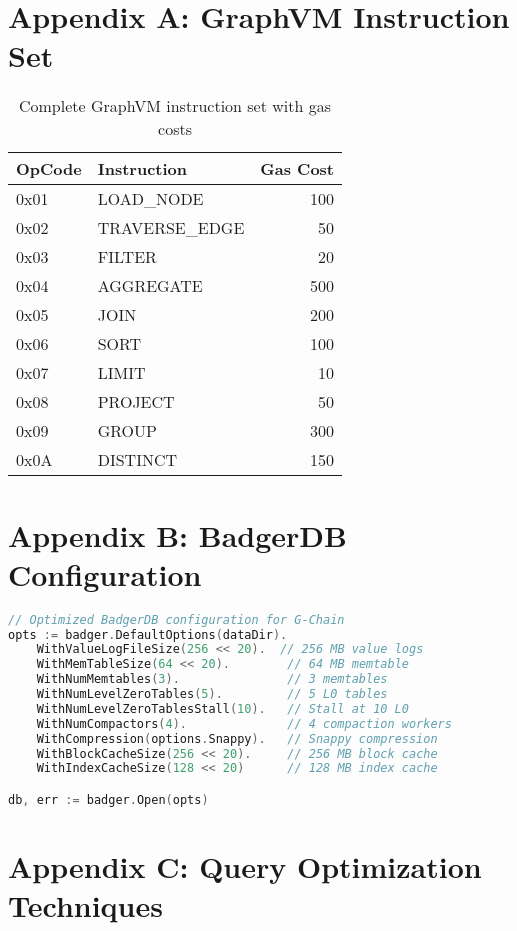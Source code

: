 \documentclass[11pt,a4paper]{article}
\begin{document}
\appendix

\section{Appendix A: GraphVM Instruction Set}

\begin{table}[h]
\centering
\small
\begin{tabular}{@{}llr@{}}
\toprule
\textbf{OpCode} & \textbf{Instruction} & \textbf{Gas Cost} \\ \midrule
0x01 & LOAD\_NODE & 100 \\
0x02 & TRAVERSE\_EDGE & 50 \\
0x03 & FILTER & 20 \\
0x04 & AGGREGATE & 500 \\
0x05 & JOIN & 200 \\
0x06 & SORT & 100 \\
0x07 & LIMIT & 10 \\
0x08 & PROJECT & 50 \\
0x09 & GROUP & 300 \\
0x0A & DISTINCT & 150 \\ \bottomrule
\end{tabular}
\caption{Complete GraphVM instruction set with gas costs}
\end{table}

\section{Appendix B: BadgerDB Configuration}

\begin{lstlisting}[language=Go, basicstyle=\footnotesize\ttfamily]
// Optimized BadgerDB configuration for G-Chain
opts := badger.DefaultOptions(dataDir).
    WithValueLogFileSize(256 << 20).  // 256 MB value logs
    WithMemTableSize(64 << 20).        // 64 MB memtable
    WithNumMemtables(3).               // 3 memtables
    WithNumLevelZeroTables(5).         // 5 L0 tables
    WithNumLevelZeroTablesStall(10).   // Stall at 10 L0
    WithNumCompactors(4).              // 4 compaction workers
    WithCompression(options.Snappy).   // Snappy compression
    WithBlockCacheSize(256 << 20).     // 256 MB block cache
    WithIndexCacheSize(128 << 20)      // 128 MB index cache

db, err := badger.Open(opts)
\end{lstlisting}

\section{Appendix C: Query Optimization Techniques}
\end{document}
